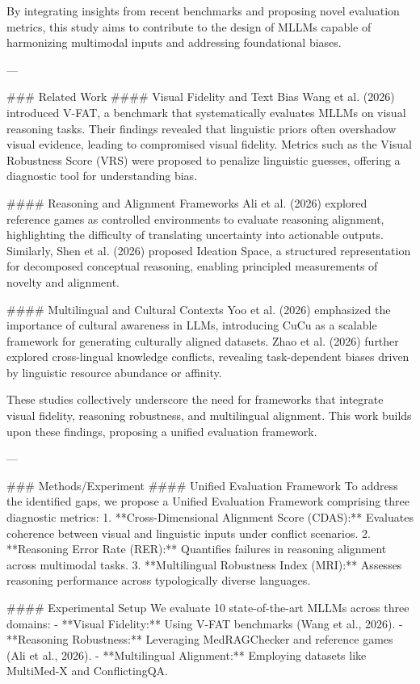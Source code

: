 By integrating insights from recent benchmarks and proposing novel evaluation metrics, this study aims to contribute to the design of MLLMs capable of harmonizing multimodal inputs and addressing foundational biases.

---

### Related Work  
#### Visual Fidelity and Text Bias  
Wang et al. (2026) introduced V-FAT, a benchmark that systematically evaluates MLLMs on visual reasoning tasks. Their findings revealed that linguistic priors often overshadow visual evidence, leading to compromised visual fidelity. Metrics such as the Visual Robustness Score (VRS) were proposed to penalize linguistic guesses, offering a diagnostic tool for understanding bias.

#### Reasoning and Alignment Frameworks  
Ali et al. (2026) explored reference games as controlled environments to evaluate reasoning alignment, highlighting the difficulty of translating uncertainty into actionable outputs. Similarly, Shen et al. (2026) proposed Ideation Space, a structured representation for decomposed conceptual reasoning, enabling principled measurements of novelty and alignment.

#### Multilingual and Cultural Contexts  
Yoo et al. (2026) emphasized the importance of cultural awareness in LLMs, introducing CuCu as a scalable framework for generating culturally aligned datasets. Zhao et al. (2026) further explored cross-lingual knowledge conflicts, revealing task-dependent biases driven by linguistic resource abundance or affinity.

These studies collectively underscore the need for frameworks that integrate visual fidelity, reasoning robustness, and multilingual alignment. This work builds upon these findings, proposing a unified evaluation framework.

---

### Methods/Experiment  
#### Unified Evaluation Framework  
To address the identified gaps, we propose a Unified Evaluation Framework comprising three diagnostic metrics:  
1. **Cross-Dimensional Alignment Score (CDAS):** Evaluates coherence between visual and linguistic inputs under conflict scenarios.  
2. **Reasoning Error Rate (RER):** Quantifies failures in reasoning alignment across multimodal tasks.  
3. **Multilingual Robustness Index (MRI):** Assesses reasoning performance across typologically diverse languages.

#### Experimental Setup  
We evaluate 10 state-of-the-art MLLMs across three domains:  
- **Visual Fidelity:** Using V-FAT benchmarks (Wang et al., 2026).  
- **Reasoning Robustness:** Leveraging MedRAGChecker and reference games (Ali et al., 2026).  
- **Multilingual Alignment:** Employing datasets like MultiMed-X and ConflictingQA.  

